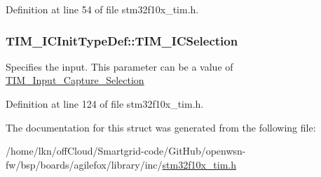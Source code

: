 Definition at line 54 of file stm32f10x\+\_\+tim.\+h.

\subsubsection[{\texorpdfstring{T\+I\+M\+\_\+\+I\+C\+Selection}{TIM_ICSelection}}]{ T\+I\+M\+\_\+\+I\+C\+Init\+Type\+Def\+::\+T\+I\+M\+\_\+\+I\+C\+Selection}\hypertarget{struct_t_i_m___i_c_init_type_def_a00b9a72e895a43dc18c69c96a149f080}{}\label{struct_t_i_m___i_c_init_type_def_a00b9a72e895a43dc18c69c96a149f080}
Specifies the input. This parameter can be a value of \hyperlink{group___t_i_m___input___capture___selection}{T\+I\+M\+\_\+\+Input\+\_\+\+Capture\+\_\+\+Selection} 

Definition at line 124 of file stm32f10x\+\_\+tim.\+h.



The documentation for this struct was generated from the following file\+:\begin{DoxyCompactItemize}
\item 
/home/lkn/off\+Cloud/\+Smartgrid-\/code/\+Git\+Hub/openwsn-\/fw/bsp/boards/agilefox/library/inc/\hyperlink{agilefox_2library_2inc_2stm32f10x__tim_8h}{stm32f10x\+\_\+tim.\+h}\end{DoxyCompactItemize}
